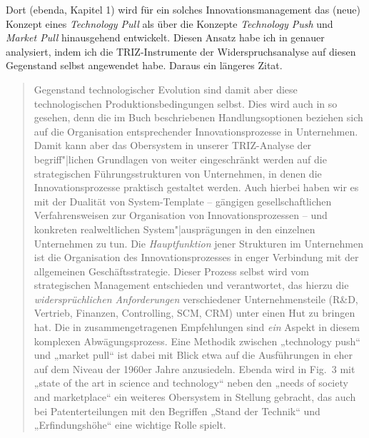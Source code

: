 \documentclass[11pt,a4paper]{article}
\begin{document}
Dort (ebenda, Kapitel 1) wird für ein solches Innovationsmanagement das (neue)
Konzept eines \emph{Technology Pull} als über die Konzepte \emph{Technology
  Push} und \emph{Market Pull} hinausgehend entwickelt.  Diesen Ansatz habe
ich in \cite{Graebe2020} genauer analysiert, indem ich die TRIZ-Instrumente
der Widerspruchsanalyse auf diesen Gegenstand selbst angewendet habe.  Daraus
ein längeres Zitat.
\begin{quote}  
  Gegenstand technologischer Evolution sind damit aber diese technologischen
  Produktionsbedingungen selbst. Dies wird auch in \cite{TESE2018} so gesehen,
  denn die im Buch beschriebenen Handlungsoptionen beziehen sich auf die
  Organisation entsprechender Innovationsprozesse in Unternehmen. Damit kann
  aber das Obersystem in unserer TRIZ-Analyse der begriff"|lichen Grundlagen
  von \cite{TESE2018} weiter eingeschränkt werden auf die strategischen
  Führungsstrukturen von Unternehmen, in denen die Innovationsprozesse
  praktisch gestaltet werden. Auch hierbei haben wir es mit der Dualität von
  System-Template -- gängigen gesellschaftlichen Verfahrensweisen zur
  Organisation von Innovationsprozessen -- und konkreten realweltlichen
  System"|ausprägungen in den einzelnen Unternehmen zu tun. Die
  \emph{Hauptfunktion} jener Strukturen im Unternehmen ist die Organisation
  des Innovationsprozesses in enger Verbindung mit der allgemeinen
  Geschäftsstrategie.  Dieser Prozess selbst wird vom strategischen Management
  entschieden und verantwortet, das hierzu die \emph{widersprüchlichen
    Anforderungen} verschiedener Unternehmensteile (R\&D, Vertrieb, Finanzen,
  Controlling, SCM, CRM) unter einen Hut zu bringen hat. Die in
  \cite{TESE2018} zusammengetragenen Empfehlungen sind \emph{ein} Aspekt in
  diesem komplexen Abwägungsprozess. Eine Methodik zwischen „technology push“
  und „market pull“ ist dabei mit Blick etwa auf die Ausführungen in
  \cite{Preez2006} eher auf dem Niveau der 1960er Jahre anzusiedeln. Ebenda
  wird in Fig.~3 mit „state of the art in science and technology“ neben den
  „needs of society and marketplace“ ein weiteres Obersystem in Stellung
  gebracht, das auch bei Patenterteilungen mit den Begriffen „Stand der
  Technik“ und „Erfindungshöhe“ eine wichtige Rolle spielt.
\end{quote}
\end{document}
